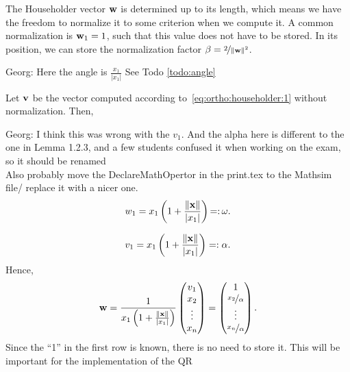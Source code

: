 \begin{intro}
  \label{intro:ortho:householder-storage}
  The Householder vector $\mathbf w$ is determined up to its length, which
  means we have the freedom to normalize it to some criterion when we
  compute it. A common normalization is $\mathbf w_1 = 1$, such that this
  value does not have to be stored. In its position, we can store the
  normalization factor $\beta = \nicefrac2{\lVert\mathbf w\rVert^2}$.

  \begin{todo}
    Georg: Here the angle is \(\frac{x_1}{|x_1|}\) See Todo \ref{todo:angle}
  \end{todo}
  Let $\mathbf v$ be the vector computed according
  to~\eqref{eq:ortho:householder:1} without normalization. Then,
  \begin{todo}
    Georg: I think this was wrong with the \(v_1\). And the alpha here is different to the one in Lemma 1.2.3, and a few
    students confused it when working on the exam, so it should be renamed \\ Also probably move the DeclareMathOpertor in
    the print.tex to the Mathsim file/ replace it with a nicer one. \label{todo:householder_alpha}
    \begin{gather}
      \label{eq:ortho:householder:2a}
      w_1 = x_1 \left(1+ \frac{\lVert\mathbf x\rVert}{\lvert x_1\rvert}\right) \operatorname{=:} \omega.
    \end{gather}
  \end{todo}
  \begin{gather}
    \label{eq:ortho:householder:2a}
    v_1 = x_1 \left(1+ \frac{\lVert\mathbf x\rVert}{\lvert x_1\rvert}\right) =: \alpha.
  \end{gather}
  Hence,
  \begin{gather}
    \mathbf w = \frac1{x_1 \left(1+ \frac{\lVert\mathbf x\rVert}{\lvert x_1\rvert}\right)}
    \begin{pmatrix}
      v_1\\x_2\\\vdots\\x_n
    \end{pmatrix}
    =
    \begin{pmatrix}
      1 \\\nicefrac{x_2}{\alpha}\\\vdots\\\nicefrac{x_n}{\alpha}
    \end{pmatrix}
    .
  \end{gather}
  Since the ``1'' in the first row is known, there is no need to store
  it. This will be important for the implementation of the QR

\end{intro}
